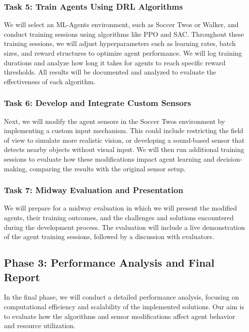 \documentclass{article}
\begin{document}
\begin{flushleft}
\subsubsection{Task 5: Train Agents Using DRL Algorithms}
\hspace{2em}We will select an ML-Agents environment, such as Soccer Twos or Walker, and conduct training sessions using algorithms like PPO and SAC. Throughout these training sessions, we will adjust hyperparameters such as learning rates, batch sizes, and reward structures to optimize agent performance. We will log training durations and analyze how long it takes for agents to reach specific reward thresholds. All results will be documented and analyzed to evaluate the effectiveness of each algorithm.

\subsubsection{Task 6: Develop and Integrate Custom Sensors}
\hspace{2em}Next, we will modify the agent sensors in the Soccer Twos environment by implementing a custom input mechanism. This could include restricting the field of view to simulate more realistic vision, or developing a sound-based sensor that detects nearby objects without visual input. We will then run additional training sessions to evaluate how these modifications impact agent learning and decision-making, comparing the results with the original sensor setup.

\subsubsection{Task 7: Midway Evaluation and Presentation}
\hspace{2em}We will prepare for a midway evaluation in which we will present the modified agents, their training outcomes, and the challenges and solutions encountered during the development process. The evaluation will include a live demonstration of the agent training sessions, followed by a discussion with evaluators.

\subsection{Phase 3: Performance Analysis and Final Report}

\hspace{2em}In the final phase, we will conduct a detailed performance analysis, focusing on computational efficiency and scalability of the implemented solutions. Our aim is to evaluate how the algorithms and sensor modifications affect agent behavior and resource utilization.


\end{flushleft}
\end{document}
